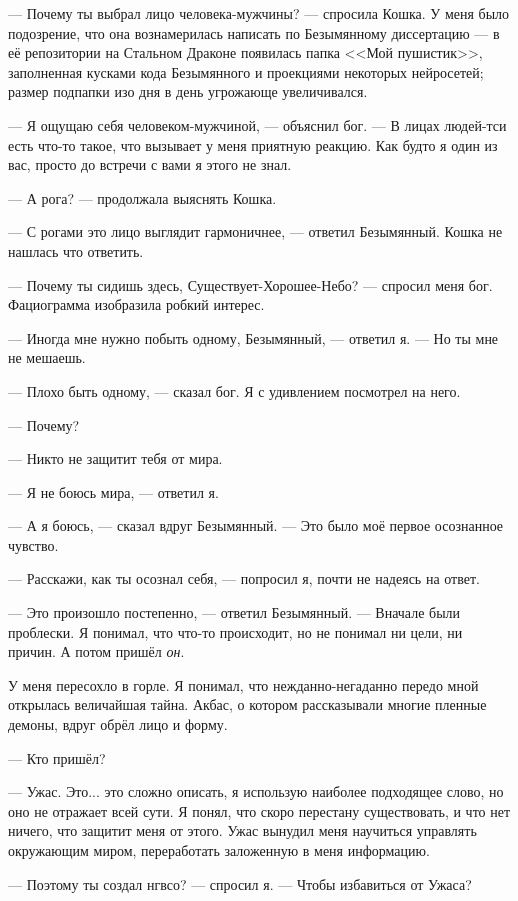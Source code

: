 --- Почему ты выбрал лицо человека-мужчины? --- спросила Кошка.
У меня было подозрение, что она вознамерилась написать по Безымянному диссертацию --- в её репозитории на Стальном Драконе появилась папка <<Мой пушистик>>, заполненная кусками кода Безымянного и проекциями некоторых нейросетей;
размер подпапки изо дня в день угрожающе увеличивался.

--- Я ощущаю себя человеком-мужчиной, --- объяснил бог.
--- В лицах людей-тси есть что-то такое, что вызывает у меня приятную реакцию.
Как будто я один из вас, просто до встречи с вами я этого не знал.

--- А рога? --- продолжала выяснять Кошка.

--- С рогами это лицо выглядит гармоничнее, --- ответил Безымянный.
Кошка не нашлась что ответить.

--- Почему ты сидишь здесь, Существует-Хорошее-Небо? --- спросил меня бог.
Фациограмма изобразила робкий интерес.

--- Иногда мне нужно побыть одному, Безымянный, --- ответил я.
--- Но ты мне не мешаешь.

--- Плохо быть одному, --- сказал бог.
Я с удивлением посмотрел на него.

--- Почему?

--- Никто не защитит тебя от мира.

--- Я не боюсь мира, --- ответил я.

--- А я боюсь, --- сказал вдруг Безымянный.
--- Это было моё первое осознанное чувство.

--- Расскажи, как ты осознал себя, --- попросил я, почти не надеясь на ответ.

--- Это произошло постепенно, --- ответил Безымянный.
--- Вначале были проблески.
Я понимал, что что-то происходит, но не понимал ни цели, ни причин.
А потом пришёл \emph{он}.

У меня пересохло в горле.
Я понимал, что нежданно-негаданно передо мной открылась величайшая тайна.
Акбас, о котором рассказывали многие пленные демоны, вдруг обрёл лицо и форму.

--- Кто пришёл?

--- Ужас.
Это... это сложно описать, я использую наиболее подходящее слово, но оно не отражает всей сути.
Я понял, что скоро перестану существовать, и что нет ничего, что защитит меня от этого.
Ужас вынудил меня научиться управлять окружающим миром, переработать заложенную в меня информацию.

--- Поэтому ты создал нгвсо? --- спросил я.
--- Чтобы избавиться от Ужаса?


